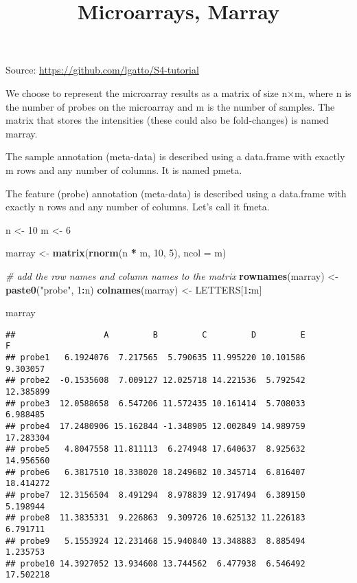 \documentclass[]{article}
\title{Microarrays, Marray}
\author{}
\date{}
\newenvironment{Shaded}{\begin{snugshade}}{\end{snugshade}}
\newcommand{\CommentTok}[1]{\textcolor[rgb]{0.56,0.35,0.01}{\textit{#1}}}
\newcommand{\DataTypeTok}[1]{\textcolor[rgb]{0.13,0.29,0.53}{#1}}
\newcommand{\DecValTok}[1]{\textcolor[rgb]{0.00,0.00,0.81}{#1}}
\newcommand{\KeywordTok}[1]{\textcolor[rgb]{0.13,0.29,0.53}{\textbf{#1}}}
\newcommand{\NormalTok}[1]{#1}
\newcommand{\OperatorTok}[1]{\textcolor[rgb]{0.81,0.36,0.00}{\textbf{#1}}}
\newcommand{\StringTok}[1]{\textcolor[rgb]{0.31,0.60,0.02}{#1}}
\begin{document}
\maketitle

Source: \url{https://github.com/lgatto/S4-tutorial}

We choose to represent the microarray results as a matrix of size n×m,
where n is the number of probes on the microarray and m is the number of
samples. The matrix that stores the intensities (these could also be
fold-changes) is named marray.

The sample annotation (meta-data) is described using a data.frame with
exactly m rows and any number of columns. It is named pmeta.

The feature (probe) annotation (meta-data) is described using a
data.frame with exactly n rows and any number of columns. Let's call it
fmeta.

\begin{Shaded}
\begin{Highlighting}[]
\NormalTok{n <-}\StringTok{ }\DecValTok{10}
\NormalTok{m <-}\StringTok{ }\DecValTok{6}

\NormalTok{marray <-}\StringTok{ }\KeywordTok{matrix}\NormalTok{(}\KeywordTok{rnorm}\NormalTok{(n }\OperatorTok{*}\StringTok{ }\NormalTok{m, }\DecValTok{10}\NormalTok{, }\DecValTok{5}\NormalTok{), }\DataTypeTok{ncol =}\NormalTok{ m)}

\CommentTok{# add the row names and column names to the matrix}
\KeywordTok{rownames}\NormalTok{(marray) <-}\StringTok{ }\KeywordTok{paste0}\NormalTok{(}\StringTok{"probe"}\NormalTok{, }\DecValTok{1}\OperatorTok{:}\NormalTok{n)}
\KeywordTok{colnames}\NormalTok{(marray) <-}\StringTok{ }\NormalTok{LETTERS[}\DecValTok{1}\OperatorTok{:}\NormalTok{m]}

\NormalTok{marray}
\end{Highlighting}
\end{Shaded}

\begin{verbatim}
##                  A         B         C         D         E         F
## probe1   6.1924076  7.217565  5.790635 11.995220 10.101586  9.303057
## probe2  -0.1535608  7.009127 12.025718 14.221536  5.792542 12.385899
## probe3  12.0588658  6.547206 11.572435 10.161414  5.708033  6.988485
## probe4  17.2480906 15.162844 -1.348905 12.002849 14.989759 17.283304
## probe5   4.8047558 11.811113  6.274948 17.640637  8.925632 14.956560
## probe6   6.3817510 18.338020 18.249682 10.345714  6.816407 18.414272
## probe7  12.3156504  8.491294  8.978839 12.917494  6.389150  5.198944
## probe8  11.3835331  9.226863  9.309726 10.625132 11.226183  6.791711
## probe9   5.1553924 12.231468 15.940840 13.348883  8.885494  1.235753
## probe10 14.3927052 13.934608 13.744562  6.477938  6.546492 17.502218
\end{verbatim}
\end{document}
